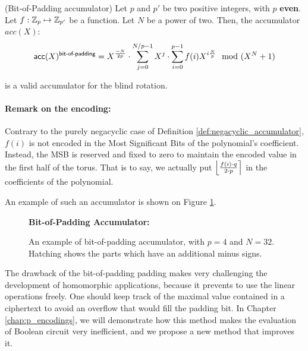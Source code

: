 \begin{definition}(Bit-of-Padding accumulator)
	Let $p$ and $p'$ be two positive integers, with $p$ \textbf{even}. Let $f: \mathbb{Z}_p \mapsto \mathbb{Z}_{p'}$ be a function. Let $N$ be a power of two. Then, the accumulator $acc(X)$:
	\[
		\textsf{acc}(X)^{\textsf{bit-of-padding}} = X^{\frac{-N}{2p}} \cdot \sum_{j=0}^{N / p - 1} X^j \cdot \sum_{i=0}^{p - 1} f(i) X^{i \frac{N}{p}} \mod (X^N + 1)
	\]
	
\noindent is a valid accumulator for the blind rotation.
	\paragraph{Remark on the encoding:}
	Contrary to the purely negacyclic case of Definition \ref{def:negacyclic_accumulator}, $f(i)$ is not encoded in the Most Significant Bits of the polynomial's coefficient. Instead, the MSB is reserved and fixed to zero to maintain the encoded value in the first half of the torus. That is to say, we actually put $\left \lfloor \frac{f(i) \cdot q}{2 \cdot p} \right \rceil$ in the coefficients of the polynomial.
\end{definition}


An example of such an accumulator is shown on Figure \ref{fig:negacyclic_accumulator}.

\begin{figure}[H]
	\centering
				
	\vspace{1.5em}
	
	\textbf{Bit-of-Padding Accumulator:}\\[0.5em]
	
	\caption{An example of bit-of-padding accumulator, with $p=4$ and $N = 32$. Hatching shows the parts which have an additional minus signs.}
	\label{fig:negacyclic_accumulator}
\end{figure}





The drawback of the bit-of-padding padding makes very challenging the development of homomorphic applications, because it prevents to use the linear operations freely. One should keep track of the maximal value contained in a ciphertext to avoid an overflow that would fill the padding bit. In Chapter \ref{chap:p_encodings}, we will demonstrate how this method makes the evaluation of Boolean circuit very inefficient, and we propose a new method that improves it.

